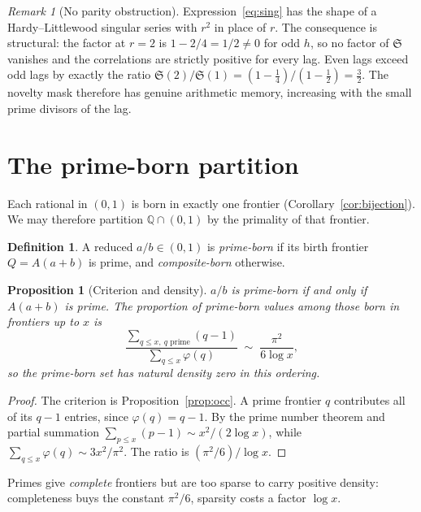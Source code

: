 \documentclass[11pt,a4paper]{article}
\theoremstyle{plain}
\newtheorem{proposition}[theorem]{Proposition}
\theoremstyle{definition}
\newtheorem{definition}[theorem]{Definition}
\theoremstyle{remark}
\newtheorem{remark}[theorem]{Remark}
\newcommand{\Q}{\mathbb{Q}}
\begin{document}
\begin{remark}[No parity obstruction]\label{rem:parity}
Expression~\eqref{eq:sing} has the shape of a Hardy--Littlewood singular series
with $r^2$ in place of $r$. The consequence is structural: the factor at $r = 2$
is $1 - 2/4 = 1/2 \ne 0$ for odd $h$, so no factor of $\mathfrak{S}$ vanishes and
the correlations are strictly positive for every lag. Even lags exceed odd lags
by exactly the ratio
$\mathfrak{S}(2)/\mathfrak{S}(1) = (1-\tfrac14)/(1-\tfrac12) = \tfrac32$. The
novelty mask therefore has genuine arithmetic memory, increasing with the small
prime divisors of the lag.
\end{remark}

\section{The prime-born partition}
\label{sec:partition}

Each rational in $(0,1)$ is born in exactly one frontier
(Corollary~\ref{cor:bijection}). We may therefore partition $\Q \cap (0,1)$ by
the primality of that frontier.

\begin{definition}
A reduced $a/b \in (0,1)$ is \emph{prime-born} if its birth frontier
$Q = A(a+b)$ is prime, and \emph{composite-born} otherwise.
\end{definition}

\begin{proposition}[Criterion and density]\label{prop:primeborn}
$a/b$ is prime-born if and only if $A(a+b)$ is prime. The proportion of
prime-born values among those born in frontiers up to $x$ is
\[
  \frac{\sum_{q \le x,\ q \text{ prime}} (q-1)}{\sum_{q\le x} \varphi(q)}
  \;\sim\; \frac{\pi^2}{6 \log x},
\]
so the prime-born set has natural density zero in this ordering.
\end{proposition}

\begin{proof}
The criterion is Proposition~\ref{prop:occ}. A prime frontier $q$ contributes
all of its $q-1$ entries, since $\varphi(q) = q-1$. By the prime number theorem
and partial summation $\sum_{p \le x} (p-1) \sim x^2/(2\log x)$, while
$\sum_{q\le x}\varphi(q) \sim 3x^2/\pi^2$. The ratio is
$(\pi^2/6)/\log x$.
\end{proof}

Primes give \emph{complete} frontiers but are too sparse to carry positive
density: completeness buys the constant $\pi^2/6$, sparsity costs a factor
$\log x$.
\end{document}
